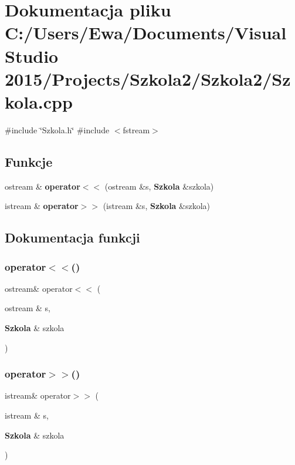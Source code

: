 \section{Dokumentacja pliku C\+:/\+Users/\+Ewa/\+Documents/\+Visual Studio 2015/\+Projects/\+Szkola2/\+Szkola2/\+Szkola.cpp}
\label{_szkola_8cpp}
{\ttfamily \#include \char`\"{}Szkola.\+h\char`\"{}}\newline
{\ttfamily \#include $<$fstream$>$}\newline
\subsection*{Funkcje}
\begin{DoxyCompactItemize}
\item 
ostream \& \textbf{ operator$<$$<$} (ostream \&s, \textbf{ Szkola} \&szkola)
\item 
istream \& \textbf{ operator$>$$>$} (istream \&s, \textbf{ Szkola} \&szkola)
\end{DoxyCompactItemize}


\subsection{Dokumentacja funkcji}
\mbox{\label{_szkola_8cpp_add41882b5f95833d8642c9b687b36818}} 
\subsubsection{operator$<$$<$()}
{\footnotesize\ttfamily ostream\& operator$<$$<$ (\begin{DoxyParamCaption}\item[{ostream \&}]{s,  }\item[{\textbf{ Szkola} \&}]{szkola }\end{DoxyParamCaption})}

\mbox{\label{_szkola_8cpp_a5a2f94d0c0560a5fee36beba5c8501cd}} 
\subsubsection{operator$>$$>$()}
{\footnotesize\ttfamily istream\& operator$>$$>$ (\begin{DoxyParamCaption}\item[{istream \&}]{s,  }\item[{\textbf{ Szkola} \&}]{szkola }\end{DoxyParamCaption})}

